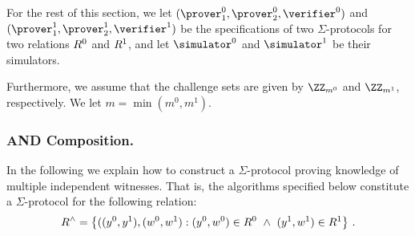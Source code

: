 \documentclass[runningheads]{llncs}
\begin{document}
  For the rest of this section, we let $(\prover_1^0,\prover_2^0,\verifier^0)$ and $(\prover_1^1,\prover_2^1,\verifier^1)$ be the specifications of two $\Sigma$-protocols for two relations $R^0$ and $R^1$, and let $\simulator^0$ and $\simulator^1$ be their simulators.

  Furthermore, we assume that the challenge sets are given by $\ZZ_{m^0}$ and $\ZZ_{m^1}$, respectively.
  We let $m=\min(m^0,m^1)$.


\subsubsection{AND Composition.}
  In the following we explain how to construct a $\Sigma$-protocol proving knowledge of multiple independent witnesses.
  That is, the algorithms specified below constitute a $\Sigma$-protocol for the following relation:
$$
  R^\land = \left\{ ((y^0,y^1),(w^0,w^1) : (y^0,w^0)\in R^0 ~\land~ (y^1,w^1)\in R^1\right\}\,.
$$
  
\end{document}

